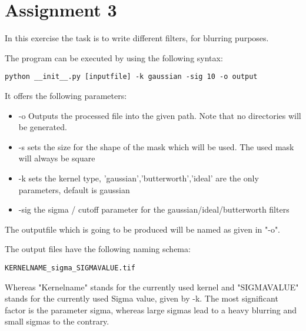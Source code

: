 \section{Assignment 3}
In this exercise the task is to write different filters, for blurring purposes.

The program can be executed by using the following syntax:
\begin{verbatim}
python __init__.py [inputfile] -k gaussian -sig 10 -o output
\end{verbatim}
It offers the following parameters:

\begin{itemize}
\item -o Outputs the processed file into the given path. Note that no directories will be generated.
\item -s sets the size for the shape of the mask which will be used. The used mask will always be square
\item -k sets the kernel type, 'gaussian','butterworth','ideal' are the only parameters, default is gaussian
\item -sig the sigma / cutoff parameter for the gaussian/ideal/butterworth filters
\end{itemize}

The outputfile which is going to be produced will be named as given in "-o".

The output files have the following naming schema:

\begin{verbatim}
KERNELNAME_sigma_SIGMAVALUE.tif
\end{verbatim}

Whereas "Kernelname" stands for the currently used kernel and "SIGMAVALUE" stands for the currently used Sigma value, given by -k.
The most significant factor is the parameter sigma, whereas large sigmas lead to a heavy blurring and small sigmas to the contrary.


